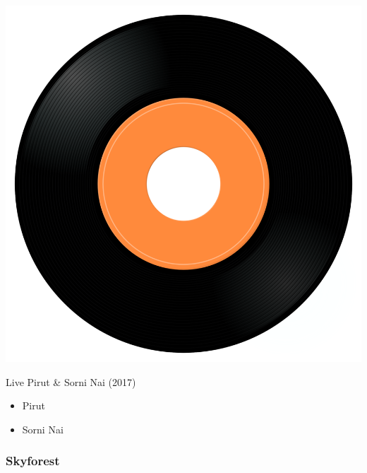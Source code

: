 \begin{minipage}[t]{0.25\textwidth}
\captionsetup{type=figure}
\includegraphics[width=\textwidth]{Images/cover.png}
\caption*{Live Pirut \& Sorni Nai (2017)}
\end{minipage}
\begin{minipage}[t]{0.25\textwidth}\vspace{0pt}
\begin{itemize}[nosep,leftmargin=1em,labelwidth=*,align=left]
	\setlength{\itemsep}{0pt}
	\item Pirut
	\item Sorni Nai
\end{itemize}
\end{minipage}

\subsubsection{Skyforest}

